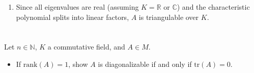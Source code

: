 \documentclass[12pt]{article}
\begin{document}
\begin{correctionbox}
\begin{enumerate}
    \textbf{Eigenspace for $\lambda = 6$:} Solve $(A - 6I)v = 0$:
    \[
    A - 6I = \begin{pmatrix}
    -3 & 1 & 1 \\
    2 & -2 & 2 \\
    1 & 1 & -3
    \end{pmatrix} \xrightarrow{\text{row reduction}} \begin{pmatrix}
    1 & 0 & -1 \\
    0 & 1 & -2 \\
    0 & 0 & 0
    \end{pmatrix}.
    \]
    The equations are $x = z$ and $y = 2z$. A basis is:
    \[
    \left\{ \begin{pmatrix}1 \\ 2 \\ 1\end{pmatrix} \right\}.
    \]
    The geometric multiplicity is 1.

    \item Since all eigenvalues are real (assuming $K = \mathbb{R}$ or $\mathbb{C}$) and the characteristic polynomial splits into linear factors, $A$ is triangulable over $K$.
\end{enumerate}
\end{correctionbox}

\section{}
Let \( n \in \mathbb{N} \), \( K \) a commutative field, and \( A \in M \).
\begin{itemize}
    \item If \( \mathrm{rank}(A) = 1 \), show \( A \) is diagonalizable if and only if \( \mathrm{tr}(A) = 0 \).
\end{itemize}
\end{document}
